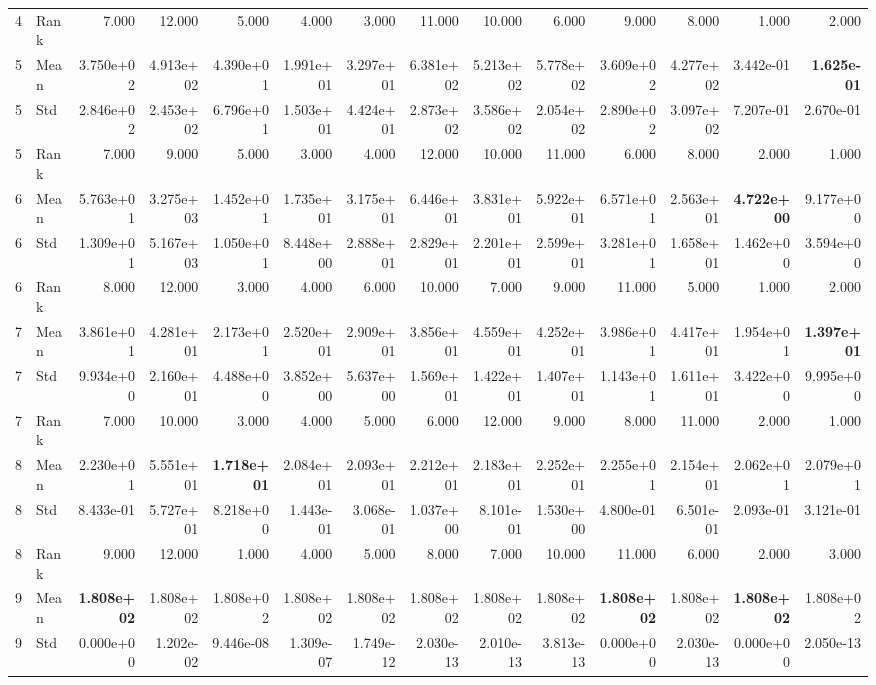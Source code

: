 \begin{table}[t]
\begin{tabular}{llrrrrrrrrrrrr}
4 & Rank & 7.000 & 12.000 & 5.000 & 4.000 & 3.000 & 11.000 & 10.000 & 6.000 & 9.000 & 8.000 & 1.000 & 2.000 \\
5 & Mean & 3.750e+02 & 4.913e+02 & 4.390e+01 & 1.991e+01 & 3.297e+01 & 6.381e+02 & 5.213e+02 & 5.778e+02 & 3.609e+02 & 4.277e+02 & 3.442e-01 & \textbf{1.625e-01} \\
5 & Std & 2.846e+02 & 2.453e+02 & 6.796e+01 & 1.503e+01 & 4.424e+01 & 2.873e+02 & 3.586e+02 & 2.054e+02 & 2.890e+02 & 3.097e+02 & 7.207e-01 & 2.670e-01 \\
5 & Rank & 7.000 & 9.000 & 5.000 & 3.000 & 4.000 & 12.000 & 10.000 & 11.000 & 6.000 & 8.000 & 2.000 & 1.000 \\
6 & Mean & 5.763e+01 & 3.275e+03 & 1.452e+01 & 1.735e+01 & 3.175e+01 & 6.446e+01 & 3.831e+01 & 5.922e+01 & 6.571e+01 & 2.563e+01 & \textbf{4.722e+00} & 9.177e+00 \\
6 & Std & 1.309e+01 & 5.167e+03 & 1.050e+01 & 8.448e+00 & 2.888e+01 & 2.829e+01 & 2.201e+01 & 2.599e+01 & 3.281e+01 & 1.658e+01 & 1.462e+00 & 3.594e+00 \\
6 & Rank & 8.000 & 12.000 & 3.000 & 4.000 & 6.000 & 10.000 & 7.000 & 9.000 & 11.000 & 5.000 & 1.000 & 2.000 \\
7 & Mean & 3.861e+01 & 4.281e+01 & 2.173e+01 & 2.520e+01 & 2.909e+01 & 3.856e+01 & 4.559e+01 & 4.252e+01 & 3.986e+01 & 4.417e+01 & 1.954e+01 & \textbf{1.397e+01} \\
7 & Std & 9.934e+00 & 2.160e+01 & 4.488e+00 & 3.852e+00 & 5.637e+00 & 1.569e+01 & 1.422e+01 & 1.407e+01 & 1.143e+01 & 1.611e+01 & 3.422e+00 & 9.995e+00 \\
7 & Rank & 7.000 & 10.000 & 3.000 & 4.000 & 5.000 & 6.000 & 12.000 & 9.000 & 8.000 & 11.000 & 2.000 & 1.000 \\
8 & Mean & 2.230e+01 & 5.551e+01 & \textbf{1.718e+01} & 2.084e+01 & 2.093e+01 & 2.212e+01 & 2.183e+01 & 2.252e+01 & 2.255e+01 & 2.154e+01 & 2.062e+01 & 2.079e+01 \\
8 & Std & 8.433e-01 & 5.727e+01 & 8.218e+00 & 1.443e-01 & 3.068e-01 & 1.037e+00 & 8.101e-01 & 1.530e+00 & 4.800e-01 & 6.501e-01 & 2.093e-01 & 3.121e-01 \\
8 & Rank & 9.000 & 12.000 & 1.000 & 4.000 & 5.000 & 8.000 & 7.000 & 10.000 & 11.000 & 6.000 & 2.000 & 3.000 \\
9 & Mean & \textbf{1.808e+02} & 1.808e+02 & 1.808e+02 & 1.808e+02 & 1.808e+02 & 1.808e+02 & 1.808e+02 & 1.808e+02 & \textbf{1.808e+02} & 1.808e+02 & \textbf{1.808e+02} & 1.808e+02 \\
9 & Std & 0.000e+00 & 1.202e-02 & 9.446e-08 & 1.309e-07 & 1.749e-12 & 2.030e-13 & 2.010e-13 & 3.813e-13 & 0.000e+00 & 2.030e-13 & 0.000e+00 & 2.050e-13 \\

\end{tabular}
\end{table}
